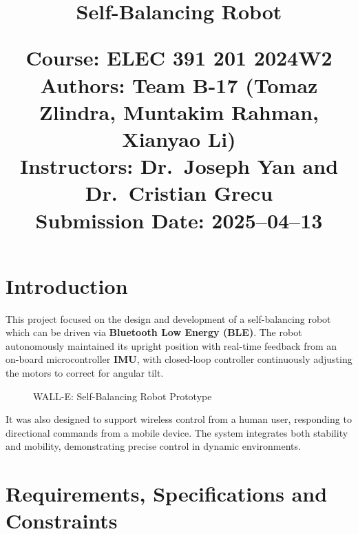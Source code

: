 \documentclass{article}
\title{
    \Huge \textbf{Self-Balancing Robot}

    \vspace{100pt}

    \large Course: ELEC 391 201 2024W2 \\[1em]
    \large Authors: Team B-17 (Tomaz Zlindra, Muntakim Rahman, Xianyao Li) \\[1em]
    \large Instructors: Dr.\ Joseph Yan and Dr.\ Cristian Grecu \\[1em]
    \large Submission Date: 2025--04--13 \\
}
\date{} %
\begin{document}
\maketitle

\newpage %

\tableofcontents %

\newpage %

\section{Introduction}

\begin{minipage}{\linewidth}
    This project focused on the design and development of a self-balancing robot which can be driven via \textbf{Bluetooth Low Energy (BLE)}.
    The robot autonomously maintained its upright position with real-time feedback from an on-board microcontroller \textbf{IMU},
    with closed-loop controller continuously adjusting the motors to correct for angular tilt. \\
\end{minipage}

\begin{figure}[H]
    \centering
    {\setlength{\fboxsep}{0pt}}
    \caption{WALL-E: Self-Balancing Robot Prototype}
    \label{fig:wall_e}
\end{figure}

\begin{minipage}{\linewidth}
    It was also designed to support wireless control from a human user, responding to directional commands from a mobile device.
    The system integrates both stability and mobility, demonstrating precise control in dynamic environments.
\end{minipage}

\section{Requirements, Specifications and Constraints}
\end{document}
